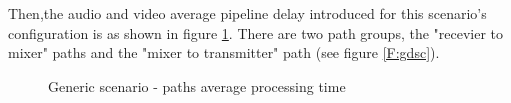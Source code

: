 Then,the audio and video average pipeline delay introduced for this scenario's configuration is as shown in figure \ref{F:gsavgpt}. There are two path groups, the "recevier to mixer" paths and the "mixer to transmitter" path (see figure \ref{F:gdsc}).

\begin{figure}[!htb]
  \begin{center}
    \begin{subfigmatrix}{2}
    \end{subfigmatrix}
    \caption{Generic scenario - paths average processing time}
    \label{F:gsavgpt}
  \end{center}
\end{figure}

